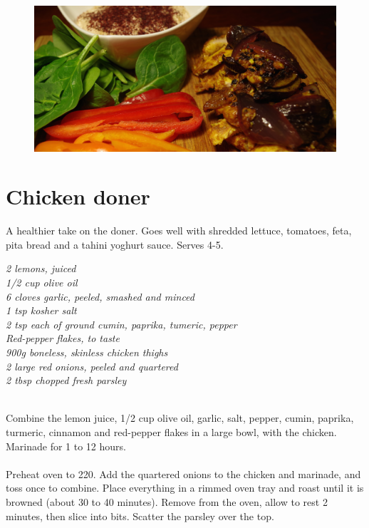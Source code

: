 \documentclass{tufte-book}
\begin{document}
\newpage

\begin{figure}[h]
  \includegraphics[width=\linewidth]{chickendoner.JPG}
\end{figure}

\section{Chicken doner}

A healthier take on the doner. Goes well with shredded lettuce, tomatoes, feta, pita bread and a tahini yoghurt sauce. Serves 4-5.

\smallskip
\emph{2 lemons, juiced
\\1/2 cup olive oil
\\6 cloves garlic, peeled, smashed and minced
\\1 tsp kosher salt
\\2 tsp each of ground cumin, paprika, tumeric, pepper
\\Red-pepper flakes, to taste
\\900g boneless, skinless chicken thighs
\\2 large red onions, peeled and quartered
\\2 tbsp chopped fresh parsley}

\smallskip
{} 
\\Combine the lemon juice, 1/2 cup olive oil, garlic, salt, pepper, cumin, paprika, turmeric, cinnamon and red-pepper flakes in a large bowl, with the chicken. Marinade for 1 to 12 hours.
\\ 
\\Preheat oven to 220\celsius. Add the quartered onions to the chicken and marinade, and toss once to combine. Place everything in a rimmed oven tray and roast until it is browned (about 30 to 40 minutes). Remove from the oven, allow to rest 2 minutes, then slice into bits. Scatter the parsley over the top.
\end{document}
